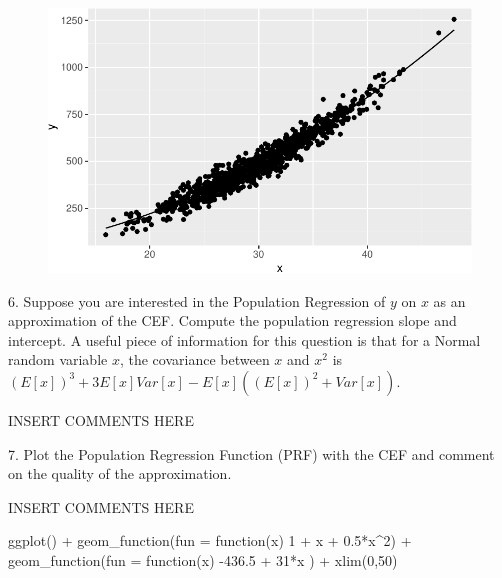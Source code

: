 \documentclass[
  letterpaper,
  DIV=11,
  numbers=noendperiod]{scrartcl}
\newenvironment{Shaded}{\begin{snugshade}}{\end{snugshade}}
\newcommand{\AttributeTok}[1]{\textcolor[rgb]{0.40,0.45,0.13}{#1}}
\newcommand{\ControlFlowTok}[1]{\textcolor[rgb]{0.00,0.23,0.31}{#1}}
\newcommand{\DecValTok}[1]{\textcolor[rgb]{0.68,0.00,0.00}{#1}}
\newcommand{\FloatTok}[1]{\textcolor[rgb]{0.68,0.00,0.00}{#1}}
\newcommand{\FunctionTok}[1]{\textcolor[rgb]{0.28,0.35,0.67}{#1}}
\newcommand{\NormalTok}[1]{\textcolor[rgb]{0.00,0.23,0.31}{#1}}
\newcommand{\SpecialCharTok}[1]{\textcolor[rgb]{0.37,0.37,0.37}{#1}}
\begin{document}
\begin{figure}[H]

{\centering \includegraphics{a1template_files/figure-pdf/unnamed-chunk-6-1.pdf}

}

\end{figure}

6. Suppose you are interested in the Population Regression of \(y\) on
\(x\) as an approximation of the CEF. Compute the population regression
slope and intercept. A useful piece of information for this question is
that for a Normal random variable \(x\), the covariance between \(x\)
and \(x^2\) is \((E[x])^3 + 3E[x]Var[x] - E[x]((E[x])^2+ Var[x])\).

INSERT COMMENTS HERE

7. Plot the Population Regression Function (PRF) with the CEF and
comment on the quality of the approximation.

INSERT COMMENTS HERE

\begin{Shaded}
\begin{Highlighting}[]
\FunctionTok{ggplot}\NormalTok{() }\SpecialCharTok{+} 
  \FunctionTok{geom\_function}\NormalTok{(}\AttributeTok{fun =} \ControlFlowTok{function}\NormalTok{(x) }\DecValTok{1} \SpecialCharTok{+}\NormalTok{ x }\SpecialCharTok{+} \FloatTok{0.5}\SpecialCharTok{*}\NormalTok{x}\SpecialCharTok{\^{}}\DecValTok{2}\NormalTok{) }\SpecialCharTok{+}
  \FunctionTok{geom\_function}\NormalTok{(}\AttributeTok{fun =} \ControlFlowTok{function}\NormalTok{(x) }\SpecialCharTok{{-}}\FloatTok{436.5} \SpecialCharTok{+} \DecValTok{31}\SpecialCharTok{*}\NormalTok{x ) }\SpecialCharTok{+} 
  \FunctionTok{xlim}\NormalTok{(}\DecValTok{0}\NormalTok{,}\DecValTok{50}\NormalTok{)}
\end{Highlighting}
\end{Shaded}
\end{document}

